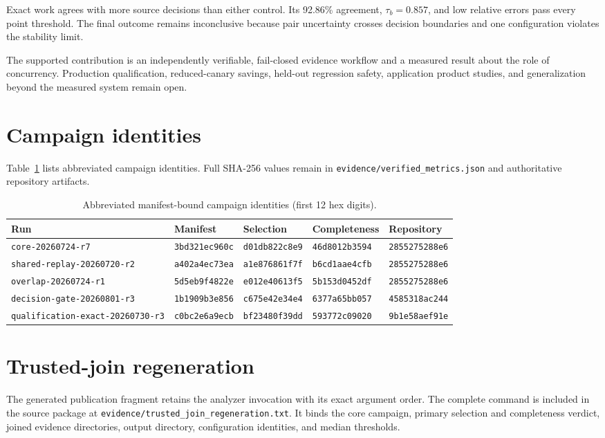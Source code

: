 \documentclass[10pt,twocolumn]{article}
\begin{document}
Exact work agrees with more source decisions than either control. Its 92.86\%
agreement, $\tau_b=0.857$, and low relative errors pass every point threshold. The final
outcome remains inconclusive because pair uncertainty crosses decision
boundaries and one configuration violates the stability limit.

The supported contribution is an independently verifiable, fail-closed
evidence workflow and a measured result about the role of concurrency.
Production qualification, reduced-canary savings, held-out regression safety,
application product studies, and generalization beyond the measured system
remain open.




\clearpage
\onecolumn
\appendix
\section{Campaign identities}

Table~\ref{tab:identities} lists abbreviated campaign identities. Full SHA-256
values remain in \texttt{evidence/verified\_metrics.json} and authoritative
repository artifacts.

\begin{table}[htbp]
\caption{Abbreviated manifest-bound campaign identities (first 12 hex digits).}
\label{tab:identities}
\centering\small
\begin{tabular}{@{}lllll@{}}
\toprule
Run & Manifest & Selection & Completeness & Repository \\
\midrule
\texttt{core-20260724-r7} & \texttt{3bd321ec960c} & \texttt{d01db822c8e9} & \texttt{46d8012b3594} & \texttt{2855275288e6} \\
\texttt{shared-replay-20260720-r2} & \texttt{a402a4ec73ea} & \texttt{a1e876861f7f} & \texttt{b6cd1aae4cfb} & \texttt{2855275288e6} \\
\texttt{overlap-20260724-r1} & \texttt{5d5eb9f4822e} & \texttt{e012e40613f5} & \texttt{5b153d0452df} & \texttt{2855275288e6} \\
\texttt{decision-gate-20260801-r3} & \texttt{1b1909b3e856} & \texttt{c675e42e34e4} & \texttt{6377a65bb057} & \texttt{4585318ac244} \\
\texttt{qualification-exact-20260730-r3} & \texttt{c0bc2e6a9ecb} & \texttt{bf23480f39dd} & \texttt{593772c09020} & \texttt{9b1e58aef91e} \\
\bottomrule
\end{tabular}
\end{table}

\section{Trusted-join regeneration}

The generated publication fragment retains the analyzer invocation with its
exact argument order. The complete command is included in the source package
at \texttt{evidence/trusted\_join\_regeneration.txt}. It binds the core
campaign, primary selection and completeness verdict, joined evidence
directories, output directory, configuration identities, and median
thresholds.
\end{document}

